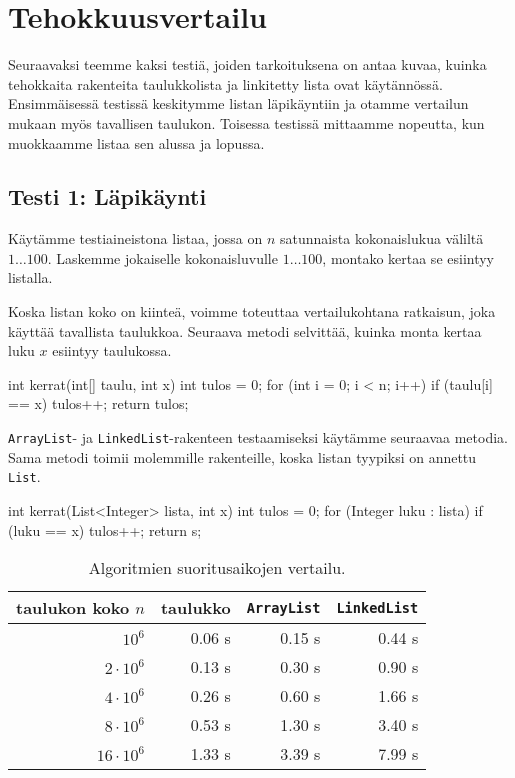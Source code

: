 \section{Tehokkuusvertailu}

Seuraavaksi teemme kaksi testiä, joiden tarkoituksena on
antaa kuvaa, kuinka tehokkaita rakenteita
taulukkolista ja linkitetty lista ovat käytännössä.
Ensimmäisessä testissä keskitymme listan läpikäyntiin ja otamme
vertailun mukaan myös tavallisen taulukon.
Toisessa testissä mittaamme nopeutta, kun muokkaamme listaa
sen alussa ja lopussa.

\subsection{Testi 1: Läpikäynti}

Käytämme testiaineistona listaa, jossa on $n$ satunnaista
kokonaislukua väliltä $1 \dots 100$.
Laskemme jokaiselle kokonaisluvulle $1 \dots 100$,
montako kertaa se esiintyy listalla.

Koska listan koko on kiinteä, voimme toteuttaa vertailukohtana
ratkaisun, joka käyttää tavallista taulukkoa.
Seuraava metodi selvittää, kuinka monta kertaa luku $x$
esiintyy taulukossa.

\begin{code}
int kerrat(int[] taulu, int x) {
    int tulos = 0;
    for (int i = 0; i < n; i++) {
        if (taulu[i] == x) tulos++;
    }
    return tulos;
}
\end{code}

\texttt{ArrayList}- ja \texttt{LinkedList}-rakenteen
testaamiseksi käytämme seuraavaa metodia.
Sama metodi toimii molemmille rakenteille,
koska listan tyypiksi on annettu \texttt{List}.

\begin{code}
int kerrat(List<Integer> lista, int x) {
    int tulos = 0;
    for (Integer luku : lista) {
        if (luku == x) tulos++;
    }
    return s;
}
\end{code}

\begin{table}
\center
\begin{tabular}{rrrr}
taulukon koko $n$ & taulukko & \texttt{ArrayList} & \texttt{LinkedList} \\
\hline
$10^6$ & 0.06 s & 0.15 s & 0.44 s \\
$2 \cdot 10^6$ & 0.13 s & 0.30 s & 0.90 s \\
$4 \cdot 10^6$ & 0.26 s & 0.60 s & 1.66 s \\
$8 \cdot 10^6$ & 0.53 s & 1.30 s & 3.40 s \\
$16 \cdot 10^6$ & 1.33 s & 3.39 s & 7.99 s \\
\end{tabular}
\caption{Algoritmien suoritusaikojen vertailu.}
\label{tab:kerver}
\end{table}

